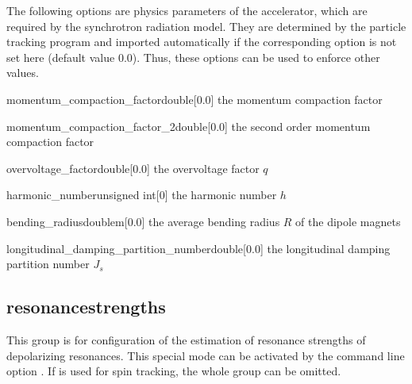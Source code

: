 \documentclass[a4paper]{scrartcl}
\begin{document}
The following options are physics parameters of the accelerator, which are required by the
synchrotron radiation model. They are determined by the particle tracking program and
imported automatically if the corresponding option is not set here (default value
\num{0.0}). Thus, these options can be used to enforce other values.\\[2mm]

\begin{configdoc}{momentum_compaction_factor}{double}{}[0.0]
  the momentum compaction factor \alphac
\end{configdoc}

\begin{configdoc}{momentum_compaction_factor_2}{double}{}[0.0]
   the second order momentum compaction factor \alphactwo
\end{configdoc}

\begin{configdoc}{overvoltage_factor}{double}{}[0.0]
  the overvoltage factor $q$
\end{configdoc}

\begin{configdoc}{harmonic_number}{unsigned int}{}[0]
  the harmonic number $h$
\end{configdoc}

\begin{configdoc}{bending_radius}{double}{\si{\m}}[0.0]
  the average bending radius $R$ of the dipole magnets
\end{configdoc}

\begin{configdoc}{longitudinal_damping_partition_number}{double}{}[0.0]
  the longitudinal damping partition number $J_s$
\end{configdoc}



\subsection{resonancestrengths}
\label{sec:config-resstr}
This group is for configuration of the estimation of resonance strengths of depolarizing
resonances. This special mode can be activated by the command line option .
If \polem is used for spin tracking, the whole group can be omitted.\\[2mm]
\end{document}
